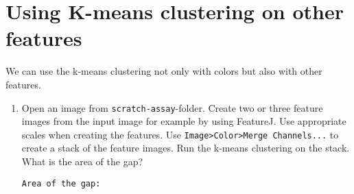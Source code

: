 \section{Using K-means clustering on other features}

We can use the k-means clustering not only with colors but also with other features. 

\begin{enumerate}
\item Open an image from {\tt scratch-assay}-folder. Create two or three feature images from the input image for example by using FeatureJ. Use appropriate scales when creating the features. Use {\tt Image>Color>Merge Channels...} to create a stack of the feature images. Run the k-means clustering on the stack. What is the area of the gap?
\begin{verbatim}
Area of the gap:

\end{verbatim}

\end{enumerate}

